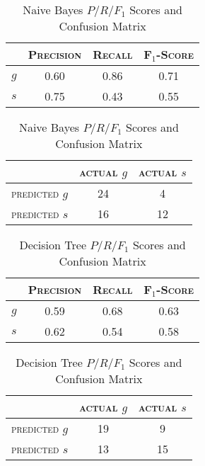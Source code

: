\begin{table}[ht]
\begin{minipage}[b]{0.45\linewidth}\centering
\begin{tabular}{ c | c  c  c }
	& \textsc{Precision} & \textsc{Recall} & \textsc{F$_1$-Score} \\
	\hline
	\textsc{$g$} 	& 0.60 & 0.86 & 0.71 \\
	\textsc{$s$}	& 0.75 & 0.43 & 0.55
\end{tabular}
\end{minipage}
\hspace{0.5cm}
\begin{minipage}[b]{0.45\linewidth}
\centering
\begin{tabular}{ c | c  c }
	 & \textsc{actual $g$} & \textsc{actual $s$} \\
	\hline
	\textsc{predicted $g$} 	& 24 & 4 \\
	\textsc{predicted $s$}		& 16 & 12
\end{tabular}
\end{minipage}
\caption{Naive Bayes $P/R/F_1$ Scores and Confusion Matrix}
\end{table}

\begin{table}[ht]
\begin{minipage}[b]{0.45\linewidth}\centering
\begin{tabular}{ c | c  c  c }
	& \textsc{Precision} & \textsc{Recall} & \textsc{F$_1$-Score} \\
	\hline
	\textsc{$g$} 	& 0.59 & 0.68 & 0.63 \\
	\textsc{$s$}	& 0.62 & 0.54 & 0.58
\end{tabular}
\end{minipage}
\hspace{0.5cm}
\begin{minipage}[b]{0.45\linewidth}
\centering
\begin{tabular}{ c | c  c }
	 & \textsc{actual $g$} & \textsc{actual $s$} \\
	\hline
	\textsc{predicted $g$} 	& 19 & 9 \\
	\textsc{predicted $s$}		& 13 & 15
\end{tabular}
\end{minipage}
\caption{Decision Tree $P/R/F_1$ Scores and Confusion Matrix}
\end{table}
\newpage


